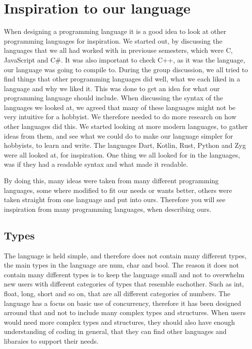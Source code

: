 \section{Inspiration to our language}
When designing a programming language it is a good idea to look at other programming languages for inspiration. We started out, by discussing the languages that we all had worked with in previouse semesters, which were C, JavaScript and C\#. It was also important to check C++, as it was the language, our language was going to compile to.
During the group discussion, we all tried to find things that other programming languages did well, what we each liked in a language and why we liked it. This was done to get an idea for what our programming language should include.
When discussing the syntax of the languages we looked at, we agreed that many of these languages might not be very intuitive for a hobbyist. We therefore needed to do more research on how other languages did this. 
We started looking at more modern languages, to gather ideas from them, and see what we could do to make our language simpler for hobbyists, to learn and write. The languages Dart, Kotlin, Rust, Python and Zyg were all looked at, for inspiration. One thing we all looked for in the languages, was if they had a readable syntax and what made it readable.

By doing this, many ideas were taken from many different programming languages, some where modified to fit our needs or wants better, others were taken straight from one language and put into ours. Therefore you will see inspiration from many programming languages, when describing ours.



\subsection{Types}
The language is held simple, and therefore does not contain many different types, the main types in the language are num, char and bool.
The reason it does not contain many different types is to keep the language small and not to overwhelm new users with different categories of types that resemble eachother. Such as int, float, long, short and so on, that are all different categories of numbers. The language has a focus on basic use of concurrency, therefore it has been designed arround that and not to include many complex types and structures. When users would need more complex types and structures, they should also have enough understanding of coding in general, that they can find other languages and libaraies to support their needs.


